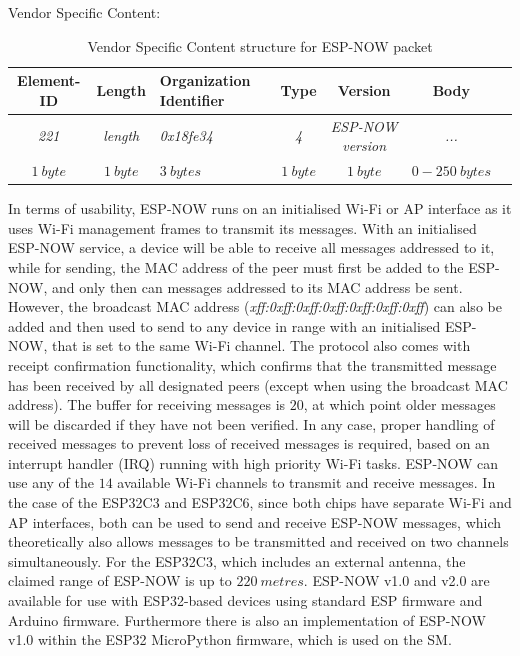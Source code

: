 \begin{table}[H]
    \centering
    Vendor Specific Content:
    \begin{tabular}{|c|c|>{\centering\arraybackslash}m{70pt}|c|c|c|c|}
        \hline
        \textbf{Element-ID} & \textbf{Length} & \textbf{Organization Identifier} & \textbf{Type} & \textbf{Version} & \textbf{Body} \\
        \hline\hline
        \textit{221} & \textit{length} & \textit{0x18fe34} & \textit{4} & \textit{ESP-NOW version} & \textit{...} \\
        \hline\hline
        $1\ byte$ & $1\ byte$ & $3\ bytes$ & $1\ byte$ & $1\ byte$ & $0-250\ bytes$ \\
        \hline
    \end{tabular}
    \vspace{\ftspace}
    \caption{Vendor Specific Content structure for ESP-NOW packet \citep[adapted from][]{espressif_systems_esp-now_nodate}}
    \label{tab:vendorpecificcontent}
\end{table}

In terms of usability, ESP-NOW runs on an initialised Wi-Fi or AP interface as it uses Wi-Fi management frames to transmit its messages. With an initialised ESP-NOW service, a device will be able to receive all messages addressed to it, while for sending, the MAC address of the peer must first be added to the ESP-NOW, and only then can messages addressed to its MAC address be sent. However, the broadcast MAC address (\textit{xff:0xff:0xff:0xff:0xff:0xff:0xff}) can also be added and then used to send to any device in range with an initialised ESP-NOW, that is set to the same Wi-Fi channel. The protocol also comes with receipt confirmation functionality, which confirms that the transmitted message has been received by all designated peers (except when using the broadcast MAC address). The buffer for receiving messages is $20$, at which point older messages will be discarded if they have not been verified. In any case, proper handling of received messages to prevent loss of received messages is required, based on an interrupt handler (IRQ) running with high priority Wi-Fi tasks. ESP-NOW can use any of the $14$ available Wi-Fi channels to transmit and receive messages. In the case of the ESP32C3 and ESP32C6, since both chips have separate Wi-Fi and AP interfaces, both can be used to send and receive ESP-NOW messages, which theoretically also allows messages to be transmitted and received on two channels simultaneously. For the ESP32C3, which includes an external antenna, the claimed range of ESP-NOW is up to $220\ metres$. ESP-NOW v1.0 and v2.0 are available for use with ESP32-based devices using standard ESP firmware and Arduino firmware. Furthermore there is also an implementation of ESP-NOW v1.0 within the ESP32 MicroPython firmware, which is used on the SM. \citep{espressif_systems_esp-now_nodate, micropython_micropython_2025-1}\\

